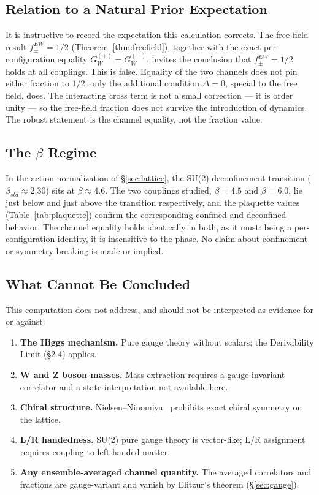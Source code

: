 \documentclass[12pt,a4paper]{article}
\newcommand{\GW}[1]{G_W^{(#1)}}
\newcommand{\fEW}[1]{f_{#1}^{\mathrm{EW}}}
\def\mathrm#1{#1}%
\begin{document}
	\subsection{Relation to a Natural Prior Expectation}
	
	It is instructive to record the expectation this calculation corrects. The free-field
	result $\fEW{\pm}=1/2$ (Theorem~\ref{thm:freefield}), together with the exact
	per-configuration equality $\GW{+}=\GW{-}$, invites the conclusion that
	$\fEW{\pm}=1/2$ holds at all couplings. This is false. Equality of the two channels
	does not pin either fraction to $1/2$; only the additional condition $\Delta=0$,
	special to the free field, does. The interacting cross term is not a small
	correction --- it is order unity --- so the free-field fraction does not survive the
	introduction of dynamics. The robust statement is the channel equality, not the
	fraction value.
	
	\subsection{The \texorpdfstring{$\beta$}{beta} Regime}
	
	In the action normalization of \S\ref{sec:lattice}, the SU(2) deconfinement
	transition ($\beta_{\mathrm{std}}\approx2.30$) sits at $\beta\approx4.6$. The two
	couplings studied, $\beta=4.5$ and $\beta=6.0$, lie just below and just above the
	transition respectively, and the plaquette values (Table~\ref{tab:plaquette})
	confirm the corresponding confined and deconfined behavior. The channel equality
	holds identically in both, as it must: being a per-configuration identity, it is
	insensitive to the phase. No claim about confinement or symmetry breaking is made
	or implied.
	
	\subsection{What Cannot Be Concluded}
	
	This computation does not address, and should not be interpreted as evidence for or
	against:
	
	\begin{enumerate}[leftmargin=*,label=\arabic*.]
		\item \textbf{The Higgs mechanism.}  Pure gauge theory without scalars; the
		Derivability Limit (\S2.4) applies.
		\item \textbf{W and Z boson masses.}  Mass extraction requires a gauge-invariant
		correlator and a state interpretation not available here.
		\item \textbf{Chiral structure.}  Nielsen--Ninomiya~\cite{NN1,NN2} prohibits exact
		chiral symmetry on the lattice.
		\item \textbf{L/R handedness.}  SU(2) pure gauge theory is vector-like; L/R
		assignment requires coupling to left-handed matter.
		\item \textbf{Any ensemble-averaged channel quantity.}  The averaged correlators
		and fractions are gauge-variant and vanish by Elitzur's theorem (\S\ref{sec:gauge}).
	\end{enumerate}
	
\end{document}
